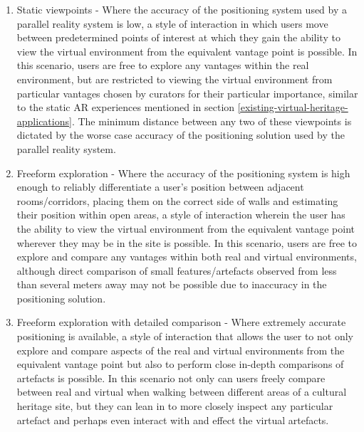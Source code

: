 \begin{enumerate}
	\item Static viewpoints - Where the accuracy of the positioning system used by a parallel reality system is low, a style of interaction in which users move between predetermined points of interest at which they gain the ability to view the virtual environment from the equivalent vantage point is possible. In this scenario, users are free to explore any vantages within the real environment, but are restricted to viewing the virtual environment from particular vantages chosen by curators for their particular importance, similar to the static AR experiences mentioned in section \ref{existing-virtual-heritage-applications}. The minimum distance between any two of these viewpoints is dictated by the worse case accuracy of the positioning solution used by the parallel reality system.
	
	\item Freeform exploration - Where the accuracy of the positioning system is high enough to reliably differentiate a user's position between adjacent rooms/corridors, placing them on the correct side of walls and estimating their position within open areas, a style of interaction wherein the user has the ability to view the virtual environment from the equivalent vantage point wherever they may be in the site is possible. In this scenario, users are free to explore and compare any vantages within both real and virtual environments, although direct comparison of small features/artefacts observed from less than several meters away may not be possible due to inaccuracy in the positioning solution.
	
	\item Freeform exploration with detailed comparison - Where extremely accurate positioning is available, a style of interaction that allows the user to not only explore and compare aspects of the real and virtual environments from the equivalent vantage point but also to perform close in-depth comparisons of artefacts is possible. In this scenario not only can users freely compare between real and virtual when walking between different areas of a cultural heritage site, but they can lean in to more closely inspect any particular artefact and perhaps even interact with and effect the virtual artefacts.
\end{enumerate}


